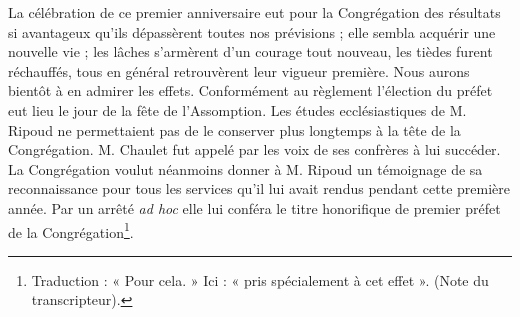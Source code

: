 La célébration de ce premier anniversaire eut pour la Congrégation des résultats si avantageux qu'ils dépassèrent toutes nos prévisions ; elle sembla acquérir une nouvelle vie ; les lâches s'armèrent d'un courage tout nouveau, les tièdes furent réchauffés, tous en général retrouvèrent leur vigueur première. Nous aurons bientôt à en admirer les effets. Conformément au règlement l'élection du préfet eut lieu le jour de la fête de l'Assomption. Les études ecclésiastiques de M. Ripoud ne permettaient pas de le conserver plus longtemps à la tête de la Congrégation. M. Chaulet fut appelé par les voix de ses confrères à lui succéder. La Congrégation voulut néanmoins donner à M. Ripoud un témoignage de sa reconnaissance pour tous les services qu'il lui avait rendus pendant cette première année. Par un arrêté \textit{ad hoc} elle lui conféra le titre honorifique de premier préfet de la Congrégation\footnote{Traduction : « Pour cela. » Ici : « pris spécialement à cet effet ». (Note du transcripteur).}.
